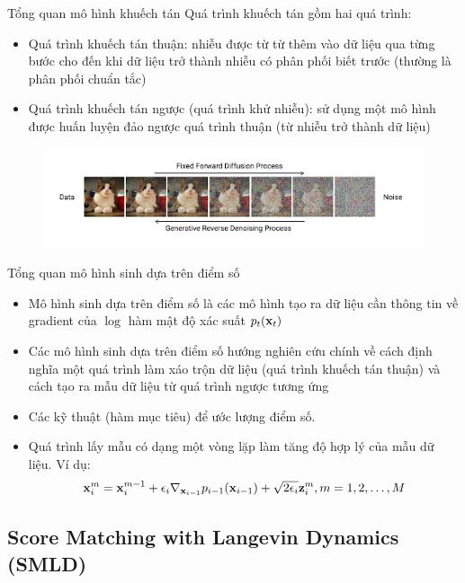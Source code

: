 \documentclass[10pt]{beamer}
\theoremstyle{remark}
\numberwithin{algocf}{section}
\numberwithin{equation}{section}
\numberwithin{dl}{section}
\numberwithin{figure}{section}
\begin{document}
\begin{frame}{Tổng quan mô hình khuếch tán}
	Quá trình khuếch tán gồm hai quá trình:
	\begin{itemize}
		\item Quá trình khuếch tán thuận: nhiễu được từ từ thêm vào dữ liệu qua từng bước cho đến khi dữ liệu trở thành nhiễu có phân phối biết trước (thường là phân phối chuẩn tắc)
		\item Quá trình khuếch tán ngược (quá trình khử nhiễu): sử dụng một mô hình được huấn luyện đảo ngược quá trình thuận (từ nhiễu trở thành dữ liệu)
	\end{itemize}
	\begin{figure}[H]
		\centering
		\includegraphics[width=0.9\linewidth]{figures/Fixed_Forward_Diffusion_Process.png}
	\end{figure}
\end{frame}

\begin{frame}{Tổng quan mô hình sinh dựa trên điểm số}
	\begin{itemize}
		\item Mô hình sinh dựa trên điểm số là các mô hình tạo ra dữ liệu cần thông tin về gradient của $\log$ hàm mật độ xác suất $p_t(\bold{x}_t)$
		\item Các mô hình sinh dựa trên điểm số hướng nghiên cứu chính về cách định nghĩa một quá trình làm xáo trộn dữ liệu (quá trình khuếch tán thuận) và cách tạo ra mẫu dữ liệu từ quá trình ngược tương ứng
		\item Các kỹ thuật (hàm mục tiêu) để ước lượng điểm số.
		\item Quá trình lấy mẫu có dạng một vòng lặp làm tăng độ hợp lý của mẫu dữ liệu. Ví dụ:
		\begin{equation*}
			\bold{x}_i^m = \bold{x}_i^{m-1} + \epsilon_i \nabla_{\bold{x}_{i-1}} p_{i-1}(\bold{x}_{i-1}) + \sqrt{2 \epsilon_i} \bold{z}_i^m, m = 1, 2, \dots, M
		\end{equation*}
	\end{itemize}
\end{frame}

\subsection{Score Matching with Langevin Dynamics (SMLD)}
\end{document}
